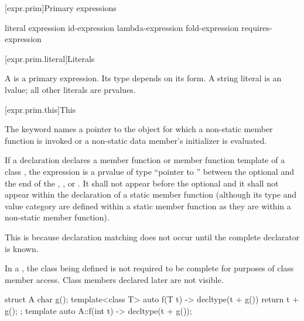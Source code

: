 [expr.prim]{Primary expressions}%

\begin{bnf}
\br
    literal\br
    \br
    \terminal{(} expression \terminal{)}\br
    id-expression\br
    lambda-expression\br
    fold-expression\br
    requires-expression
\end{bnf}

[expr.prim.literal]{Literals}

\pnum
A
%
%
is a primary expression.
Its type depends on its form.
A string literal is an lvalue; all other literals are prvalues.

[expr.prim.this]{This}

\pnum
{}%
The keyword  names a pointer to the object for which a non-static member
function is invoked or a non-static data member's
initializer is evaluated.

\pnum
If a declaration declares a member function or member function template of a
class , the expression  is a prvalue of type ``pointer to
 '' between the optional
 and the end of the ,
, or . It shall not appear
before the optional  and it shall not appear within
the declaration of a static member function (although its type and value category
are defined within a static member function as they are within a non-static
member function). \begin{note} This is because declaration matching does not
occur until the complete declarator is known. \end{note}
\begin{note}
In a ,
the class being defined is not required to be complete
for purposes of class member access.
Class members declared later are not visible.
\begin{example}
\begin{codeblock}
struct A {
  char g();
  template<class T> auto f(T t) -> decltype(t + g())
    { return t + g(); }
};
template auto A::f(int t) -> decltype(t + g());
\end{codeblock}
\end{example}
\end{note}

